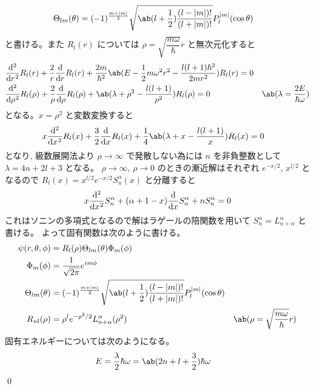 \documentclass[uplatex,dvipdfmx,a4paper,11pt]{jlreq}
\makeatletter
\theoremstyle{definition}
\renewenvironment{proof}[1][\proofname]{\par
  \normalfont
  \topsep6\p@\@plus6\p@ \trivlist
  \item[\hskip\labelsep{\bfseries #1}\@addpunct{\bfseries}]\ignorespaces\quad\par
}{%
  \qed\endtrivlist\@endpefalse
}
\renewcommand\proofname{証明}
\makeatother
\begin{document}
\begin{proof}
  \begin{align}
    \Theta_{lm}(\theta) & = (-1)^{\frac{m + |m|}{2}}\sqrt{\ab(l + \frac{1}{2})\frac{(l - |m|)!}{(l + |m|)!}}P_l^{|m|}(\cos\theta)
  \end{align}
  と書ける。また $R_l(r)$ については $\rho = \sqrt{\dfrac{m\omega}{\hbar}}r$ と無次元化すると
  \begin{align}
     & \diff[2]{}{r}R_l(r) + \frac{2}{r}\diff{}{r}R_l(r) + \frac{2m}{\hbar^2}\ab(E - \frac{1}{2}m\omega^2r^2 - \frac{l(l+1)\hbar^2}{2m r^2})R_l(r) = 0                                         \\
     & \diff[2]{}{\rho}R_l(\rho) + \frac{2}{\rho}\diff{}{\rho}R_l(\rho) + \ab(\lambda + \rho^2 - \frac{l(l+1)}{\rho^2})R_l(\rho) = 0                   & \ab(\lambda = \frac{2E}{\hbar\omega})
  \end{align}
  となる。$x = \rho^2$ と変数変換すると
  \begin{align}
     & x\diff[2]{}{x}R_l(x) + \frac{3}{2}\diff{}{x}R_l(x) + \frac{1}{4}\ab(\lambda + x - \frac{l(l+1)}{x})R_l(x) = 0
  \end{align}
  となり, 級数展開法より $\rho\to\infty$ で発散しない為には $n$ を非負整数として $\lambda = 4n + 2l + 3$ となる。
  $\rho\to\infty$, $\rho\to 0$ のときの漸近解はそれぞれ $e^{-x/2}$, $x^{l/2}$ となるので $R_l(x) = x^{l/2}e^{-x/2}S_n^\alpha(x)$ と分離すると
  \begin{align}
    x\diff[2]{}{x}S_n^\alpha + (\alpha + 1 - x)\diff{}{x}S_n^\alpha + nS_n^\alpha = 0
  \end{align}
  これはソニンの多項式となるので解はラゲールの陪関数を用いて $S_n^\alpha = L_{n + \alpha}^\alpha$ と書ける。
  よって固有関数は次のように書ける。
  \begin{align}
    \psi(r, \theta, \phi) & = R_l(\rho)\Theta_{lm}(\theta)\Phi_m(\phi)                                                                                                           \\
    \Phi_m(\phi)          & = \frac{1}{\sqrt{2\pi}}e^{im\phi}                                                                                                                    \\
    \Theta_{lm}(\theta)   & = (-1)^{\frac{m + |m|}{2}}\sqrt{\ab(l + \frac{1}{2})\frac{(l - |m|)!}{(l + |m|)!}}P_l^{|m|}(\cos\theta)                                              \\
    R_{nl}(\rho)          & = \rho^{l}e^{-\rho^2/2}L_{n + \alpha}^\alpha(\rho^2)                                                    & \ab(\rho = \sqrt{\dfrac{m\omega}{\hbar}}r)
  \end{align}
  固有エネルギーについては次のようになる。
  \begin{align}
    E & = \frac{\lambda}{2}\hbar\omega = \ab(2n + l + \frac{3}{2})\hbar\omega
  \end{align}
\end{proof}
\end{document}
